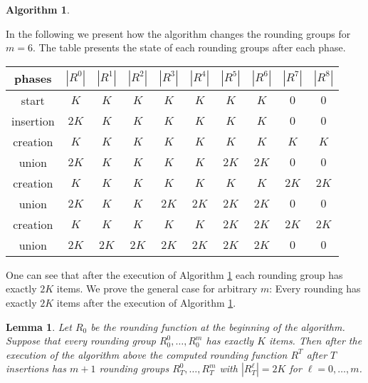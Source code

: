 \documentclass[a4paper,11pt]{article}
\newtheorem{lem}[thm]{Lemma}
\newtheorem{algo}{Algorithm}
\begin{document}
\begin{algo}\label{alg7}
$\phantom{f}$\\
 \begin{algorithm}[H]
  \end{algorithm}
\end{algo}
In the following we present how the algorithm changes the rounding groups for $m = 6$. The table presents the state of each
rounding
groups after each phase.
\begin{table}\centering
\begin{tabular}{c|c|c|c|c|c|c|c|c|c}
phases & $|R^0|$ & $|R^1|$ & $|R^2|$ & $|R^3|$ & $|R^4|$ & $|R^5|$ & $|R^6|$ & $|R^7|$ & $|R^8|$\\
\hline
start & $K$ & $K$ & $K$ & $K$ & $K$ & $K$ & $K$ & $0$ & $0$ \\
insertion & $2K$ & $K$ & $K$ & $K$ & $K$ & $K$ & $K$ & $0$ & $0$ \\
creation & $K$ & $K$ & $K$ & $K$ & $K$ & $K$ & $K$ & $K$ & $K$\\
union & $2K$ & $K$ & $K$ & $K$ & $K$ & $2K$ & $2K$ & $0$ & $0$ \\
creation & $K$ & $K$ & $K$ & $K$ & $K$ & $K$ & $K$ & $2K$ & $2K$ \\
union & $2K$ & $K$ & $K$ & $2K$ & $2K$ & $2K$ & $2K$ & $0$ & $0$ \\
creation & $K$ & $K$ & $K$ & $K$ & $K$ & $2K$ & $2K$ & $2K$ & $2K$ \\
union & $2K$ & $2K$ & $2K$ & $2K$ & $2K$ & $2K$ & $2K$ & $0$ & $0$ \\
\end{tabular}
\end{table}
One can see that after the execution of Algorithm \ref{alg7} each rounding group has exactly $2K$ items. We prove the
general case for arbitrary $m$: Every rounding has exactly $2K$ items after the execution of Algorithm \ref{alg7}.
\begin{lem}\label{lem13}
	Let $R_0$ be the rounding function at the beginning of the algorithm. Suppose that every 
	rounding group	$R_{0}^0, \ldots, R_{0}^m$	has exactly $K$ items.
	Then after the execution of the algorithm above the computed rounding function $R^T$ after $T$ insertions
	has $m+1$ rounding groups $R_{T}^0, \ldots,R_{T}^m$ with $|R_{T}^{\ell}| = 2K$ for $\ell = 0, \ldots, m$. 
\end{lem}
\end{document}
